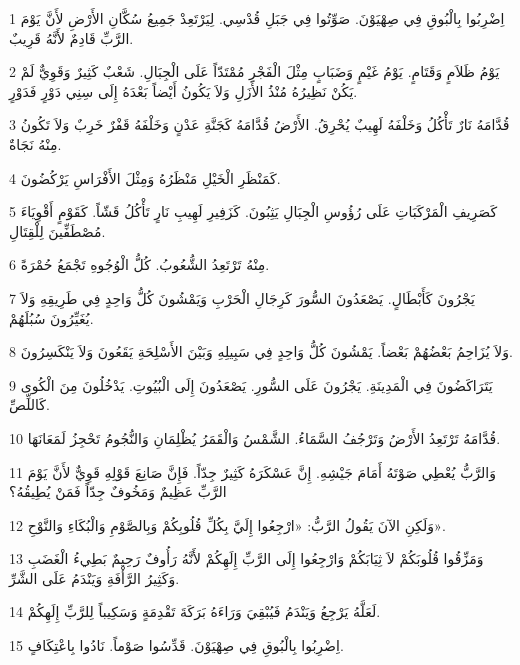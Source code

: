 \par 1 اِضْرِبُوا بِالْبُوقِ فِي صِهْيَوْنَ. صَوِّتُوا فِي جَبَلِ قُدْسِي. لِيَرْتَعِدْ جَمِيعُ سُكَّانِ الأَرْضِ لأَنَّ يَوْمَ الرَّبِّ قَادِمٌ لأَنَّهُ قَرِيبٌ.
\par 2 يَوْمُ ظَلاَمٍ وَقَتَامٍ. يَوْمُ غَيْمٍ وَضَبَابٍ مِثْلَ الْفَجْرِ مُمْتَدّاً عَلَى الْجِبَالِ. شَعْبٌ كَثِيرٌ وَقَوِيٌّ لَمْ يَكُنْ نَظِيرُهُ مُنْذُ الأَزَلِ وَلاَ يَكُونُ أَيْضاً بَعْدَهُ إِلَى سِنِي دَوْرٍ فَدَوْرٍ.
\par 3 قُدَّامَهُ نَارٌ تَأْكُلُ وَخَلْفَهُ لَهِيبٌ يُحْرِقُ. الأَرْضُ قُدَّامَهُ كَجَنَّةِ عَدْنٍ وَخَلْفَهُ قَفْرٌ خَرِبٌ وَلاَ تَكُونُ مِنْهُ نَجَاةٌ.
\par 4 كَمَنْظَرِ الْخَيْلِ مَنْظَرُهُ وَمِثْلَ الأَفْرَاسِ يَرْكُضُونَ.
\par 5 كَصَرِيفِ الْمَرْكَبَاتِ عَلَى رُؤُوسِ الْجِبَالِ يَثِبُونَ. كَزَفِيرِ لَهِيبِ نَارٍ تَأْكُلُ قَشّاً. كَقَوْمٍ أَقْوِيَاءَ مُصْطَفِّينَ لِلْقِتَالِ.
\par 6 مِنْهُ تَرْتَعِدُ الشُّعُوبُ. كُلُّ الْوُجُوهِ تَجْمَعُ حُمْرَةً.
\par 7 يَجْرُونَ كَأَبْطَالٍ. يَصْعَدُونَ السُّورَ كَرِجَالِ الْحَرْبِ وَيَمْشُونَ كُلُّ وَاحِدٍ فِي طَرِيقِهِ وَلاَ يُغَيِّرُونَ سُبُلَهُمْ.
\par 8 وَلاَ يُزَاحِمُ بَعْضُهُمْ بَعْضاً. يَمْشُونَ كُلُّ وَاحِدٍ فِي سَبِيلِهِ وَبَيْنَ الأَسْلِحَةِ يَقَعُونَ وَلاَ يَنْكَسِرُونَ.
\par 9 يَتَرَاكَضُونَ فِي الْمَدِينَةِ. يَجْرُونَ عَلَى السُّورِ. يَصْعَدُونَ إِلَى الْبُيُوتِ. يَدْخُلُونَ مِنَ الْكُوى كَاللِّصِّ.
\par 10 قُدَّامَهُ تَرْتَعِدُ الأَرْضُ وَتَرْجُفُ السَّمَاءُ. الشَّمْسُ وَالْقَمَرُ يُظْلِمَانِ وَالنُّجُومُ تَحْجِزُ لَمَعَانَهَا.
\par 11 وَالرَّبُّ يُعْطِي صَوْتَهُ أَمَامَ جَيْشِهِ. إِنَّ عَسْكَرَهُ كَثِيرٌ جِدّاً. فَإِنَّ صَانِعَ قَوْلِهِ قَوِيٌّ لأَنَّ يَوْمَ الرَّبِّ عَظِيمٌ وَمَخُوفٌ جِدّاً فَمَنْ يُطِيقُهُ؟
\par 12 وَلَكِنِ الآنَ يَقُولُ الرَّبُّ: «ارْجِعُوا إِلَيَّ بِكُلِّ قُلُوبِكُمْ وَبِالصَّوْمِ وَالْبُكَاءِ وَالنَّوْحِ».
\par 13 وَمَزِّقُوا قُلُوبَكُمْ لاَ ثِيَابَكُمْ وَارْجِعُوا إِلَى الرَّبِّ إِلَهِكُمْ لأَنَّهُ رَأُوفٌ رَحِيمٌ بَطِيءُ الْغَضَبِ وَكَثِيرُ الرَّأْفَةِ وَيَنْدَمُ عَلَى الشَّرِّ.
\par 14 لَعَلَّهُ يَرْجِعُ وَيَنْدَمُ فَيُبْقِيَ وَرَاءَهُ بَرَكَةَ تَقْدِمَةٍ وَسَكِيباً لِلرَّبِّ إِلَهِكُمْ.
\par 15 اِضْرِبُوا بِالْبُوقِ فِي صِهْيَوْنَ. قَدِّسُوا صَوْماً. نَادُوا بِاعْتِكَافٍ.
